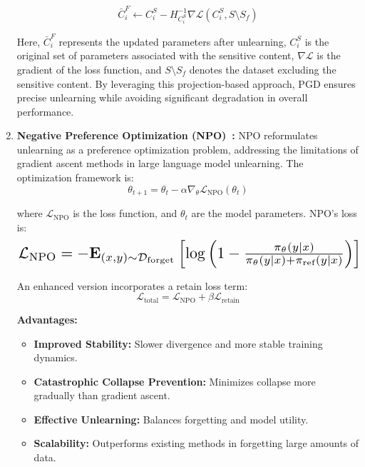 \documentclass[11pt]{article}
\begin{document}
\begin{enumerate}
        \begin{equation}
            \bar{C}_i^F \leftarrow C_i^S - H_{C_i^S}^{-1} \nabla \mathcal{L}(C_i^S, S \setminus S_f)
        \end{equation}

        Here, \( \bar{C}_i^F \) represents the updated parameters after unlearning, \( C_i^S \) is the original set of parameters associated with the sensitive content, \( \nabla \mathcal{L} \) is the gradient of the loss function, and \( S \setminus S_f \) denotes the dataset excluding the sensitive content. By leveraging this projection-based approach, PGD ensures precise unlearning while avoiding significant degradation in overall performance.

        \item \textbf{Negative Preference Optimization (NPO)~\cite{zhang2024negative}:}
        NPO reformulates unlearning as a preference optimization problem, addressing the limitations of gradient ascent methods in large language model unlearning. The optimization framework is:
        \vspace{-3pt}
        \[
            \theta_{t+1} = \theta_t - \alpha \nabla_{\theta} \mathcal{L}_{\text{NPO}}(\theta_t)
        \]

        where $\mathcal{L}_{\text{NPO}}$ is the loss function, and $\theta_t$ are the model parameters. NPO's loss is:
        \[
            \resizebox{\columnwidth}{!}{$\mathcal{L}_{\text{NPO}} = -\mathbf{E}_{(x,y) \sim \mathcal{D}_{\text{forget}}} \left[ \log \left(1 - \frac{\pi_\theta(y|x)}{\pi_\theta(y|x) + \pi_{\text{ref}}(y|x)} \right) \right]$}
        \]

        An enhanced version incorporates a retain loss term:
        \vspace{-3pt}
        \[
            \mathcal{L}_{\text{total}} = \mathcal{L}_{\text{NPO}} + \beta \mathcal{L}_{\text{retain}}
        \]

        \textbf{Advantages:}
        \begin{itemize}
            \item \textbf{Improved Stability:} Slower divergence and more stable training dynamics.
            \item \textbf{Catastrophic Collapse Prevention:} Minimizes collapse more gradually than gradient ascent.
            \item \textbf{Effective Unlearning:} Balances forgetting and model utility.
            \item \textbf{Scalability:} Outperforms existing methods in forgetting large amounts of data.
        \end{itemize}


\end{enumerate}
\end{document}
